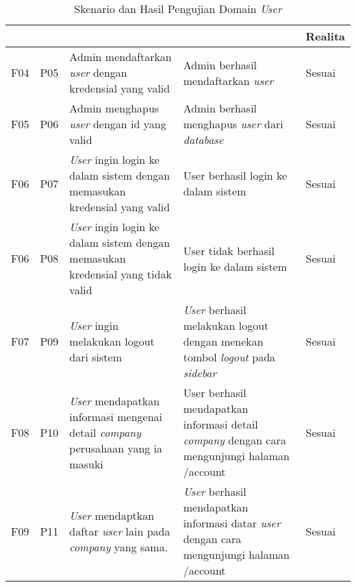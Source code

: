 \bgroup
\begin{table}[ht]
  \def\arraystretch{1.3}
  \caption{Skenario dan Hasil Pengujian Domain \textit{User}}
  \label{tab:pengujian-domain-user}
  \centering
  \begin{tabular}{|p{2cm}|p{2cm}|p{3cm}|p{3cm}|p{1.5cm}|}
    \hline
    \centering{ID Fungsional} & \centering{ID Pengujian} & \centering{Skenario}                                                                           & \centering{Ekspektasi}                                                                                    & Realita \\
    \hline
    F04                       & P05                      & Admin mendaftarkan \textit{user} dengan kredensial yang valid                                  & Admin berhasil mendaftarkan \textit{user}                                                                 & Sesuai  \\
    \hline
    F05                       & P06                      & Admin menghapus \textit{user} dengan id yang valid                                             & Admin berhasil menghapus \textit{user} dari \textit{database}                                             & Sesuai  \\
    \hline
    F06                       & P07                      & \textit{User} ingin login ke dalam sistem dengan memasukan kredensial yang valid               & User berhasil login ke dalam sistem                                                                       & Sesuai  \\
    \hline
    F06                       & P08                      & \textit{User} ingin login ke dalam sistem dengan memasukan kredensial yang tidak valid         & User tidak berhasil login ke dalam sistem                                                                 & Sesuai  \\
    \hline
    F07                       & P09                      & \textit{User} ingin melakukan logout dari sistem                                               & \textit{User} berhasil melakukan logout dengan menekan tombol \textit{logout} pada \textit{sidebar}       & Sesuai  \\
    \hline
    F08                       & P10                      & \textit{User} mendapatkan informasi mengenai detail \textit{company} perusahaan yang ia masuki & {User} berhasil mendapatkan informasi detail \textit{company} dengan cara mengunjungi halaman /account    & Sesuai  \\
    \hline
    F09                       & P11                      & \textit{User} mendaptkan daftar \textit{user} lain pada \textit{company} yang sama.            & \textit{User} berhasil mendapatkan informasi datar \textit{user} dengan cara mengunjungi halaman /account & Sesuai  \\
    \hline
  \end{tabular}
\end{table}
\egroup

